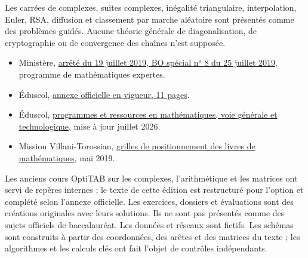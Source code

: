 Les carrées de complexes, suites complexes, inégalité triangulaire, interpolation, Euler, RSA, diffusion et classement par marche aléatoire sont présentés comme des problèmes guidés. Aucune théorie générale de diagonalisation, de cryptographie ou de convergence des chaînes n'est supposée.
\begin{itemize}
\item Ministère, \href{https://www.education.gouv.fr/bo/19/Special8/MENE1921264A.htm}{arrêté du 19 juillet 2019, BO spécial n° 8 du 25 juillet 2019}, programme de mathématiques expertes.
\item Éduscol, \href{https://eduscol.education.gouv.fr/sites/default/files/document/spe264annexe1158825pdf-84165.pdf}{annexe officielle en vigueur, 11 pages}.
\item Éduscol, \href{https://eduscol.education.gouv.fr/5817/programmes-et-ressources-en-mathematiques-voie-gt}{programmes et ressources en mathématiques, voie générale et technologique}, mise à jour juillet 2026.
\item Mission Villani-Torossian, \href{https://eduscol.education.gouv.fr/sites/default/files/document/grilles-de-positionnement-des-livres-de-mathematiques-70116.pdf}{grilles de positionnement des livres de mathématiques}, mai 2019.
\end{itemize}
Les anciens cours OptiTAB sur les complexes, l'arithmétique et les matrices ont servi de repères internes ; le texte de cette édition est restructuré pour l'option et complété selon l'annexe officielle.
Les exercices, dossiers et évaluations sont des créations originales avec leurs solutions. Ils ne sont pas présentés comme des sujets officiels de baccalauréat.
Les données et réseaux sont fictifs. Les schémas sont construits à partir des coordonnées, des arêtes et des matrices du texte ; les algorithmes et les calculs clés ont fait l'objet de contrôles indépendants.
